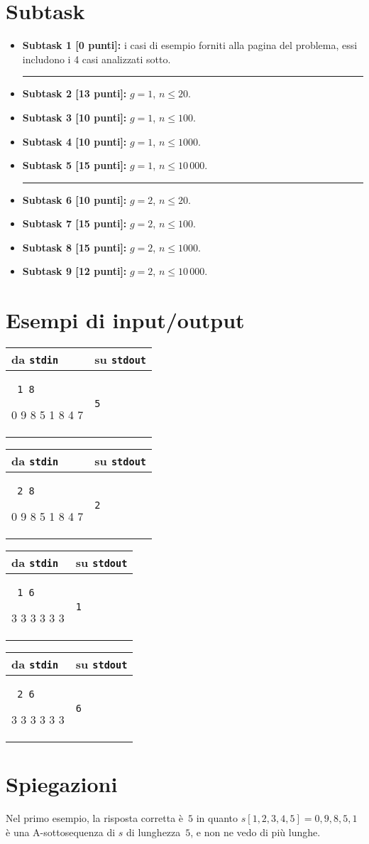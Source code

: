 \documentclass[a4paper,11pt]{article}
\newcommand{\file}[1]{\texttt{#1}}
\newcommand{\esempio}[2]{
\noindent\begin{minipage}{\textwidth}
\begin{tabular}{|p{11cm}|p{5cm}|}
	\hline
	\textbf{da \file{stdin}} & \textbf{su \file{stdout}}\\
	\hline
	\tt \small #1 &
	\tt \small #2 \\
	\hline
\end{tabular}
\end{minipage}
}
\begin{document}
\section*{Subtask}
\begin{itemize}
  \item \textbf{Subtask 1 [0 punti]:} i casi di esempio forniti alla pagina del problema, essi includono i 4 casi analizzati sotto.
      \vspace{-0.6cm}
       \begin{center}
      \rule{0.5\textwidth}{0.4pt} \hfill  \hfill \hfill
       \end{center}
      \vspace{-0.6cm}      
    \item \textbf{Subtask 2 [13 punti]:} $g=1$, $n \le 20$.
    \item \textbf{Subtask 3 [10 punti]:} $g=1$, $n \le 100$.
    \item \textbf{Subtask 4 [10 punti]:} $g=1$, $n \le 1000$.
    \item \textbf{Subtask 5 [15 punti]:} $g=1$, $n \le 10\,000$.
      \vspace{-0.6cm}
       \begin{center}
      \rule{0.5\textwidth}{0.4pt} \hfill  \hfill \hfill
       \end{center}
      \vspace{-0.6cm}      
    \item \textbf{Subtask 6 [10 punti]:} $g=2$, $n \le 20$.
    \item \textbf{Subtask 7 [15 punti]:} $g=2$, $n \le 100$.
    \item \textbf{Subtask 8 [15 punti]:} $g=2$, $n \le 1000$.
    \item \textbf{Subtask 9 [12 punti]:} $g=2$, $n \le 10\,000$.
\end{itemize}

\section*{Esempi di input/output}
\esempio{
1 8

0 9 8 5 1 8 4 7
}{5}

\esempio{
2 8

0 9 8 5 1 8 4 7
}{2}

\esempio{
1 6

3 3 3 3 3 3}{1}

\esempio{
2 6

3 3 3 3 3 3}{6}

\section*{Spiegazioni}
Nel primo esempio, la risposta corretta è~$5$ in quanto $s[1,2,3,4,5]=0,9,8,5,1$ è una A-sottosequenza di $s$ di lunghezza~$5$, e non ne vedo di più lunghe.
\end{document}
